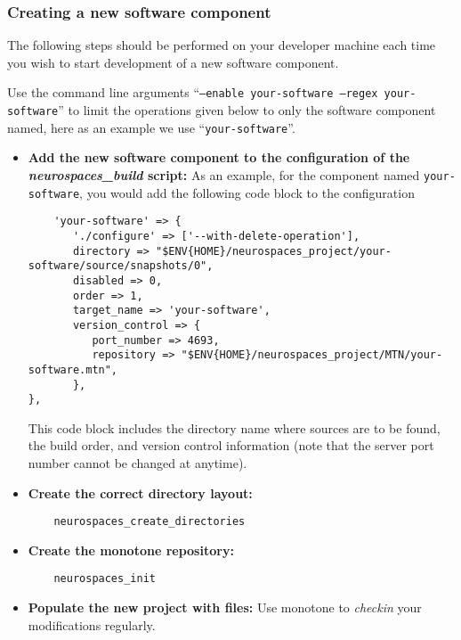 \documentclass[12pt]{article}
\begin{document}
\subsubsection*{Creating a new software component}

The following steps should be performed on your developer machine each time you wish to start development of a new software component.

Use the command line arguments ``{\tt --enable your-software --regex your-software}'' to limit the operations given below to only the software component named, here as an example we use ``{\tt your-software}''. 

\begin{itemize}
\item {\bf Add the new software component to the configuration of the
    {\it neurospaces\_build} script:} As an example, for the component
  named {\tt your-software}, you would add the following code block to
  the configuration
  \begin{footnotesize}
\begin{verbatim}
	'your-software' => {
	   './configure' => ['--with-delete-operation'],
	   directory => "$ENV{HOME}/neurospaces_project/your-software/source/snapshots/0",
	   disabled => 0,
	   order => 1,
	   target_name => 'your-software',
	   version_control => {
	      port_number => 4693,
	      repository => "$ENV{HOME}/neurospaces_project/MTN/your-software.mtn",
	   },
},
\end{verbatim}
  \end{footnotesize}
  This code block includes the directory name where sources are to be
  found, the build order, and version control information (note that
  the server port number cannot be changed at anytime).

\item {\bf Create the correct directory layout:}
\begin{verbatim}
	neurospaces_create_directories
\end{verbatim}
  
\item {\bf Create the monotone repository:}
\begin{verbatim}
	neurospaces_init
\end{verbatim}

\item {\bf Populate the new project with files:} Use monotone to {\it
    checkin} your modifications regularly.

\end{itemize}
\end{document}
